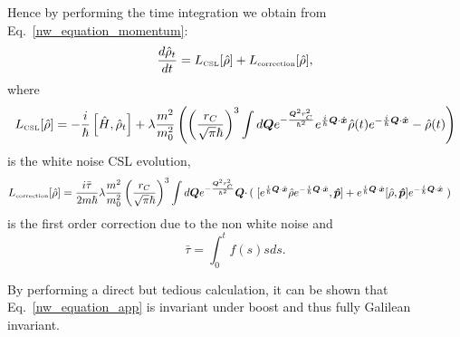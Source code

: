 \documentclass[12pt,groupedaddress,pra,aps]{revtex4-1}
\begin{document}
Hence by performing the time integration we obtain from Eq.~\eqref{nw_equation_momentum}:
\begin{equation}
\label{nw_equation_app}
\frac{d \hat{\rho}_t}{dt} = L_{\text{\tiny CSL}}[\hat{\rho}] + L_{\text{\tiny correction}}[\hat{\rho}],
\end{equation}
where 
\begin{equation}
L_{\text{\tiny CSL}}[\hat{\rho}]=-\frac{i}{\hbar}\left[ \hat{H},
 \hat{\rho}_t\right] +\lambda \frac{m^2}{m_0^2}  \left( \left(\frac{r_C}{\sqrt{\pi}\hbar}\right)^3 
\int d \bm{Q} e^{-\frac{\bm{Q}^2r_C^2}{\hbar^2}}
e^{\frac{i}{\hbar} \bm{Q} \cdot \hat{\bm{x}}}\hat{\rho}(t)e^{-\frac{i}{\hbar} \bm{Q} \cdot \hat{\bm{x}}}- \hat{\rho}(t)\right) 
\end{equation}
is the white noise CSL evolution,
\begin{equation}\label{nw_correction}
\begin{split}
L_{\text{\tiny correction}}[\hat{\rho}]=
\frac{i \bar{\tau}}{2m\hbar} \lambda \frac{m^2}{m_0^2}   \left(\frac{r_C}{\sqrt{\pi}\hbar}\right)^3
\int  d\bm{Q}  e^{-\frac{\bm{Q}^2r_C^2}{\hbar^2}} \bm{Q} \cdot  &\left(\right. 
[e^{\frac{i}{\hbar} \bm{Q} \cdot \hat{\bm{x}}} \hat{\rho} e^{-\frac{i}{\hbar} \bm{Q} \cdot \hat{\bm{x}}}, \bm{\hat{p}}]
+e^{\frac{i}{\hbar} \bm{Q} \cdot \hat{\bm{x}}} [\hat{\rho} , \bm{\hat{p}}]e^{-\frac{i}{\hbar} \bm{Q} \cdot \hat{\bm{x}}}
\left. \right)
\end{split}
\end{equation}
is the first order correction due to the non white noise and 
\begin{equation}
\bar{\tau}=\int_0^t f(s)s ds.
\end{equation}

By performing a direct but tedious calculation, it can be shown that  Eq.~\eqref{nw_equation_app} is invariant under boost and thus fully Galilean invariant.
\end{document}
